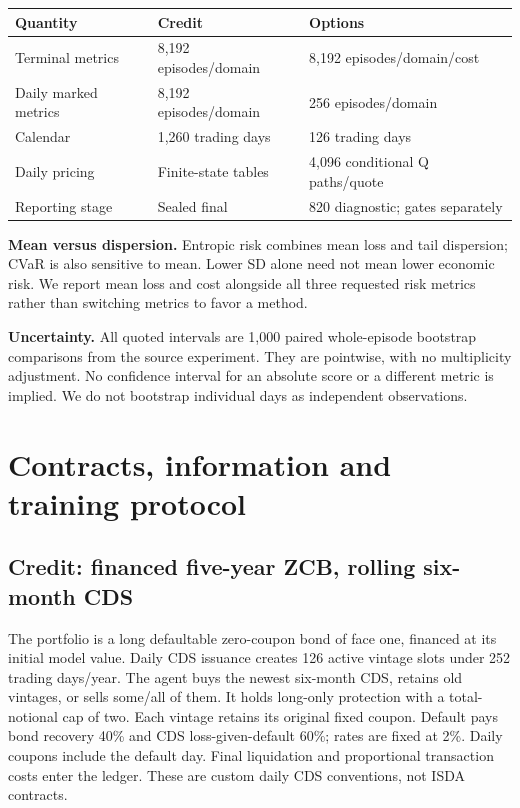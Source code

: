 \documentclass[11pt,a4paper]{article}
\begin{document}
\begin{center}
\begin{small}
\begin{tabular}{lll}
\toprule
Quantity & Credit & Options \\
\midrule
Terminal metrics & 8,192 episodes/domain & 8,192 episodes/domain/cost \\
Daily marked metrics & 8,192 episodes/domain & 256 episodes/domain \\
Calendar & 1,260 trading days & 126 trading days \\
Daily pricing & Finite-state tables & 4,096 conditional Q paths/quote \\
Reporting stage & Sealed final & 820 diagnostic; gates separately \\
\bottomrule
\end{tabular}
\end{small}\par\medskip
\end{center}
\textbf{Mean versus dispersion.} Entropic risk combines mean loss and tail dispersion; CVaR is also sensitive to mean. Lower SD alone need not mean lower economic risk. We report mean loss and cost alongside all three requested risk metrics rather than switching metrics to favor a method.

\textbf{Uncertainty.} All quoted intervals are 1,000 paired whole-episode bootstrap comparisons from the source experiment. They are pointwise, with no multiplicity adjustment. No confidence interval for an absolute score or a different metric is implied. We do not bootstrap individual days as independent observations.

\clearpage
\section{Contracts, information and training protocol}
\subsection*{Credit: financed five-year ZCB, rolling six-month CDS}
The portfolio is a long defaultable zero-coupon bond of face one, financed at its initial model value. Daily CDS issuance creates 126 active vintage slots under 252 trading days/year. The agent buys the newest six-month CDS, retains old vintages, or sells some/all of them. It holds long-only protection with a total-notional cap of two. Each vintage retains its original fixed coupon. Default pays bond recovery 40\% and CDS loss-given-default 60\%; rates are fixed at 2\%. Daily coupons include the default day. Final liquidation and proportional transaction costs enter the ledger. These are custom daily CDS conventions, not ISDA contracts.
\end{document}
